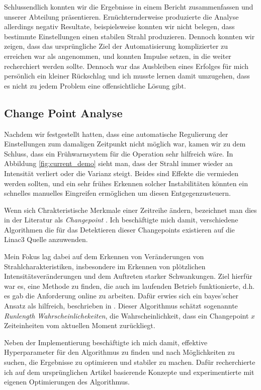 \documentclass[11pt, a4paper, titlepage, headings=standardclasses]{scrartcl}
\begin{document}
Schlussendlich konnten wir die Ergebnisse in einem Bericht zusammenfassen und unserer Abteilung präsentieren. Ernüchternderweise produzierte die Analyse allerdings negativ Resultate, beispielsweise konnten wir nicht belegen, dass bestimmte Einstellungen einen stabilen Strahl produzieren. Dennoch konnten wir zeigen, dass das ursprüngliche Ziel der Automatisierung komplizierter zu erreichen war als angenommen, und konnten Impulse setzen, in die weiter recherchiert werden sollte. Dennoch war das Ausbleiben eines Erfolges für mich persönlich ein kleiner Rückschlag und ich musste lernen damit umzugehen, dass es nicht zu jedem Problem eine offensichtliche Lösung gibt.

\subsection*{Change Point Analyse}

Nachdem wir festgestellt hatten, dass eine automatische Regulierung der Einstellungen zum damaligen Zeitpunkt nicht möglich war, kamen wir zu dem Schluss, dass ein Frühwarnsystem für die Operation sehr hilfreich wäre. In Abbildung \ref{fig:current_demo} sieht man, dass der Strahl immer wieder an Intensität verliert oder die Varianz steigt. Beides sind Effekte die vermieden werden sollten, und ein sehr frühes Erkennen solcher Instabilitäten könnten ein schnelles manuelles Eingreifen ermöglichen um diesen Entgegenzusteuern.

Wenn sich Chrakteristische Merkmale einer Zeitreihe ändern, bezeichnet man dies in der Literatur als \textit{Changepoint} \cite{Aminikhanghahi:surveymethodstime}. Ich beschäftigte mich damit, verschiedene Algorithmen die für das Detektieren dieser Changepoints existieren auf die Linac3 Quelle anzuwenden.

Mein Fokus lag dabei auf dem Erkennen von Veränderungen von Strahlcharakteristiken, insbesondere im Erkennen von plötzlichen Intensitätsveränderungen und dem Auftreten starker Schwankungen. Ziel hierfür war es, eine Methode zu finden, die auch im laufenden Betrieb funktionierte, d.h. es gab die Anforderung online zu arbeiten. Dafür erwies sich ein bayes'scher Ansatz als hilfreich, beschrieben in \cite{Adams:BayesianOnlineChangepoint}. Dieser Algorithmus schätzt sogenannte \textit{Runlength Wahrscheinlichekeiten}, die Wahrscheinlichkeit, dass ein Changepoint $x$ Zeiteinheiten vom aktuellen Moment zurückliegt.

Neben der Implementierung beschäftigte ich mich damit, effektive Hyperparameter für den Algorithmus zu finden und nach Möglichkeiten zu suchen, die Ergebnisse zu optimieren und stabiler zu machen. Dafür recherchierte ich auf dem ursprünglichen Artikel basierende Konzepte und experimentierte mit eigenen Optimierungen des Algorithmus. 
\end{document}
